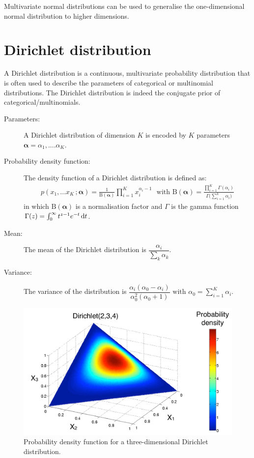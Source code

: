 Multivariate normal distributions can be used to generalise the one-dimensional normal distribution to higher dimensions.

\section*{Dirichlet distribution}

A Dirichlet distribution is a continuous, multivariate probability distribution that is often used to describe the parameters of categorical or multinomial distributions.  The Dirichlet distribution is indeed the conjugate prior of categorical/multinomials. 

\begin{description}
\item [Parameters: ] A Dirichlet distribution of dimension $K$ is encoded by $K$ parameters $\boldsymbol\alpha = \alpha_1, .... \alpha_K$. 

\item [Probability density function: ] The density function of a Dirichlet distribution is defined as:
\begin{align}
p(x_1,...x_K\,; \boldsymbol\alpha) = \frac{1}{\mathrm{B}(\boldsymbol\alpha)} \prod_{i=1}^K x_i^{\alpha_i - 1} \ \ \ \text{with } \mathrm{B}(\boldsymbol\alpha) = \frac{\prod_{i=1}^K \Gamma(\alpha_i)}{\Gamma\bigl(\sum_{i=1}^k \alpha_i\bigr)}
\end{align}
in which $ \mathrm{B}(\boldsymbol\alpha)$ is a normalisation factor and $\Gamma$ is the gamma function $\Gamma(z) = \int_0^\infty  t^{z-1} e^{-t}\,{\rm d}t$. 

\item [Mean: ] The mean of the Dirichlet distribution is $\dfrac{\alpha_i}{\sum_k \alpha_k}$.

\item [Variance: ] The variance of the distribution is $\dfrac{\alpha_i (\alpha_0-\alpha_i)}{\alpha_0^2 (\alpha_0+1)} \text{ with } \alpha_0 = \sum_{i=1}^K\alpha_i$.

\end{description}

\begin{figure}[h!]
\centering
\includegraphics[scale=0.40]{imgs/Dirichlet_appendix.pdf}
\caption{Probability density function for a three-dimensional Dirichlet distribution.} 
\label{fig:norm-appendix}
\end{figure}


